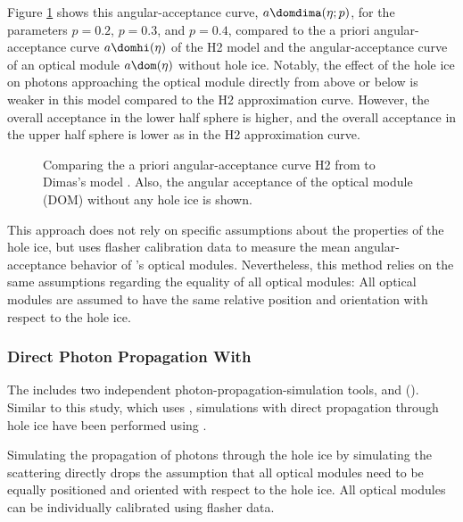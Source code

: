 Figure \ref{fig:Vohn9Oov} shows this angular-acceptance curve, $a\domdima(\eta;p)$, for the parameters $p=0.2$, $p=0.3$, and $p=0.4$, compared to the a priori angular-acceptance curve $a\domhi(\eta)$ of the H2 model and the angular-acceptance curve of an optical module $a\dom(\eta)$ without hole ice.
Notably, the effect of the hole ice on photons approaching the optical module directly from above or below is weaker in this model compared to the H2 approximation curve. However, the overall acceptance in the lower half sphere is higher, and the overall acceptance in the upper half sphere is lower as in the H2 approximation curve.

\begin{figure}[htbp]
  \caption{Comparing the a priori angular-acceptance curve H2 from \cite{icepaper} to Dimas's model \cite{flasherdataderivedicemodels}. Also, the angular acceptance of the optical module (DOM) without any hole ice is shown.}
  \label{fig:Vohn9Oov}
\end{figure}

This approach does not rely on specific assumptions about the properties of the hole ice, but uses flasher calibration data to measure the mean angular-acceptance behavior of \icecube's optical modules.
Nevertheless, this method relies on the same assumptions regarding the equality of all optical modules: All optical modules are assumed to have the same relative position and orientation with respect to the hole ice.

\subsubsection{Direct Photon Propagation With \ppc}
\label{sec:direct_photon_propagation_with_ppc}\label{sec:pocam}

The  includes two independent photon-propagation-simulation tools, \clsim and \ppc (). \cite{ppcpaper, ppcsource, ppcforhumans}
Similar to this study, which uses \clsim, simulations with direct propagation through hole ice have been performed using \ppc. \cite{martinspicehddard, martindardupdate, pocam, icrc17pocam, ppcpaper}


Simulating the propagation of photons through the hole ice by simulating the scattering directly drops the assumption that all optical modules need to be equally positioned and oriented with respect to the hole ice. All optical modules can be individually calibrated using flasher data. \cite{martinspicehddard}

